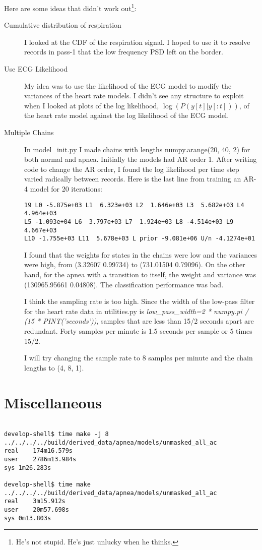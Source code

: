 \documentclass[12pt]{article}
\begin{document}
Here are some ideas that didn't work out\footnote{He's not stupid.
  He's just unlucky when he thinks.}:
\begin{description}
\item[Cumulative distribution of respiration] I looked at the CDF of
  the respiration signal.  I hoped to use it to resolve records in
  pass-1 that the low frequency PSD left on the border.
\item[Use ECG Likelihood] My idea was to use the likelihood of the ECG
  model to modify the variances of the heart rate models.  I didn't
  see any structure to exploit when I looked at plots of the log
  likelihood, $\log\left(P(y[t]|y[:t]) \right)$, of the heart rate
  model against the log likelihood of the ECG model.
\item[Multiple Chains] In model\_init.py I made chains with lengths
  numpy.arange(20, 40, 2) for both normal and apnea.  Initially the
  models had AR order 1.  After writing code to change the AR order, I
  found the log likelihood per time step varied radically between
  records.  Here is the last line from training an AR-4 model for 20
  iterations:
\begin{verbatim}
19 L0 -5.875e+03 L1  6.323e+03 L2  1.646e+03 L3  5.682e+03 L4  4.964e+03
L5 -1.093e+04 L6  3.797e+03 L7  1.924e+03 L8 -4.514e+03 L9  4.667e+03
L10 -1.755e+03 L11  5.678e+03 L prior -9.081e+06 U/n -4.1274e+01
\end{verbatim}
  I found that the weights for states in the chains were low and the
  variances were high, from (3.32607 0.99734) to (731.01504 0.79096).
  On the other hand, for the apnea with a transition to itself, the
  weight and variance was (130965.95661 0.04808).  The classification
  performance was bad.

  I think the sampling rate is too high.  Since the width of the
  low-pass filter for the heart rate data in utilities.py is
  \emph{low\_pass\_width=2 * numpy.pi / (15 * PINT('seconds'))},
  samples that are less than 15/2 seconds apart are redundant.  Forty
  samples per minute is 1.5 seconds per sample or 5 times 15/2.

  I will try changing the sample rate to 8 samples per minute and the
  chain lengths to (4, 8, 1).

\end{description}

\section{Miscellaneous}
\label{sec:misc}
\begin{verbatim}

develop-shell$ time make -j 8 ../../../../build/derived_data/apnea/models/unmasked_all_ac  
real	174m16.579s
user	2786m13.984s
sys	1m26.283s

develop-shell$ time make ../../../../build/derived_data/apnea/models/unmasked_all_ac
real	3m15.912s
user	20m57.698s
sys	0m13.803s

\end{verbatim}
\end{document}
